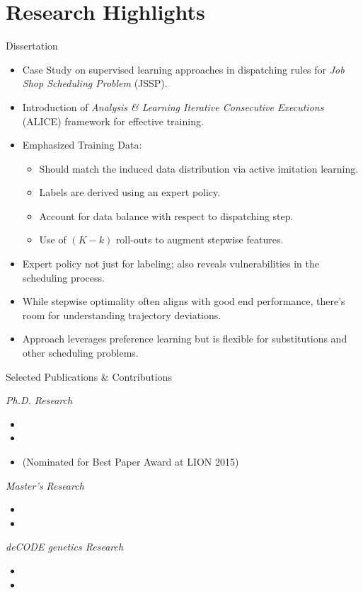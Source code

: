 \documentclass[
    NAME={Dr. Helga Ingimundardóttir},
    EMAIL={helgaingim@hi.is},
    FACULTY={Industrial Engineering},
    SUBTITLE={From Smart Algorithms in Fish Portioning to Pioneering Pipelines in Long-Range DNA Sequencing and Digital Travel},
    SEMINAR={IVT Faculty Gathering},
    DATE={September 6, 2023}
]{hi-latex/hi-beamer}
\begin{document}
\section{Research Highlights}
\begin{frame}{Dissertation}
\begin{itemize}
    \item Case Study on supervised learning approaches in dispatching rules for \emph{Job Shop Scheduling Problem} (JSSP).
    \item Introduction of \emph{Analysis \& Learning Iterative Consecutive Executions} (ALICE) framework for effective training.
    \item Emphasized Training Data:
    \begin{itemize}
        \item Should match the induced data distribution via active imitation learning.
        \item Labels are derived using an expert policy.
        \item Account for data balance with respect to dispatching step.
        \item Use of $(K-k)$ roll-outs to augment stepwise features.
    \end{itemize}
    \item Expert policy not just for labeling; also reveals vulnerabilities in the scheduling process.
    \item While stepwise optimality often aligns with good end performance, there's room for understanding trajectory deviations.
    \item Approach leverages preference learning but is flexible for substitutions and other scheduling problems.
\end{itemize}
\end{frame}

\begin{frame}{Selected Publications \& Contributions}

    \emph{Ph.D. Research}
     {\scriptsize\begin{itemize}
        \item {}
        \item {}
        \item {} (Nominated for Best Paper Award at LION 2015)
    \end{itemize}}

    \emph{Master's Research}
    {\scriptsize\begin{itemize}
    \item {}
    \item {}
    \end{itemize}}

    \emph{deCODE genetics Research}
    {\scriptsize\begin{itemize}
        \item {}
        \item {}
    \end{itemize}}
\end{frame}
\end{document}
